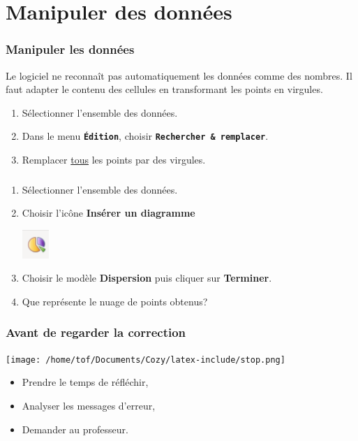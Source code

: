 \documentclass[svgnames,11pt]{beamer}
\begin{document}
\section{Manipuler des données}
\begin{frame}
    \frametitle{Manipuler les données}

Le logiciel ne reconnaît pas automatiquement les données comme des nombres. Il faut adapter le contenu des cellules en transformant les points en virgules.
\begin{activite}
\begin{enumerate}
    \item Sélectionner l'ensemble des données.
    \item Dans le menu \textbf{\texttt{Édition}}, choisir \textbf{\texttt{Rechercher \& remplacer}}.
    \item Remplacer \underline{tous} les points par des virgules.
\end{enumerate}
\end{activite} 

\end{frame}
\begin{frame}
    \frametitle{}

    \begin{activite}
    \begin{enumerate}
        \item Sélectionner l'ensemble des données.
        \item Choisir l'icône \textbf{Insérer un diagramme}
        \begin{center}
        \centering
        \includegraphics[width=1cm]{ressources/diag.png}
        \label{IMG}
        \end{center}
        \item Choisir le modèle \textbf{Dispersion} puis cliquer sur \textbf{Terminer}.
        \item Que représente le nuage de points obtenus?
    \end{enumerate}
    \end{activite}

\end{frame}
\begin{frame}
    \frametitle{Avant de regarder la correction}
\begin{center}
    \centering
    \texttt{[image: /home/tof/Documents/Cozy/latex-include/stop.png]}
    \end{center}
{\Large
    \begin{itemize}
        \item Prendre le temps de réfléchir,
        \item Analyser les messages d'erreur,
        \item Demander au professeur.
    \end{itemize}
}
\end{frame}
\end{document}

